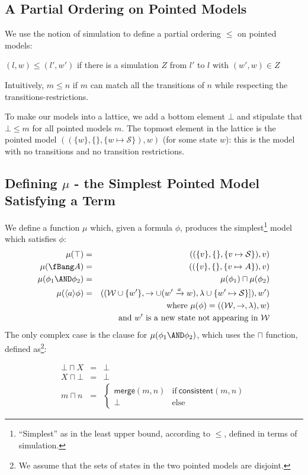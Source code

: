 \subsection{A Partial Ordering on Pointed Models}
We use the notion of simulation to define a partial ordering $\leq$ on pointed models:
\begin{definition}
$(l,w) \leq (l',w')$ if there is a simulation $Z$ from $l'$ to $l$ with $(w',w) \in Z$
\end{definition}
Intuitively, $m \leq n$ if $m$ can match all the transitions of $n$ while respecting the transitions-restrictions.

To make our models into a lattice, we add a bottom element $\bot$ and stipulate that $\bot \leq m$ for all pointed models $m$.
The topmost element in the lattice is the pointed model $( (\{w\}, \{\}, \{w \mapsto \mathcal{S}\}), w)$ (for some state $w$): this is the model with no transitions and no transition restrictions.

\subsection{Defining $\mu$ - the Simplest Pointed Model Satisfying a Term}
We define a function $\mu$ which, given a formula $\phi$, produces the simplest\footnote{``Simplest'' as in the least upper bound, according to $\leq$, defined in terms of simulation.} model which satisfies $\phi$:
\begin{eqnarray}
\mu (\top) & = & ( (\{v\}, \{\}, \{v \mapsto \mathcal{S}\}), v) \nonumber \\
\mu (\fBang A) & = & ( (\{v\}, \{\}, \{v \mapsto A\}), v) \nonumber \\
\mu (\phi_1 \AND \phi_2) & = & \mu(\phi_1) \sqcap \mu(\phi_2) \nonumber \\
\mu (\langle a \rangle \phi) & = & ( (\mathcal{W} \cup \{w'\}, \rightarrow \cup (w' \xrightarrow{a} w), \lambda \cup \{w' \mapsto \mathcal{S}\}]), w') \nonumber \\
		& & \mbox{where }\mu(\phi) = ( (\mathcal{W}, \rightarrow, \lambda), w) \nonumber \\
		& & \mbox{and }w' \mbox{ is a new state not appearing in }\mathcal{W} \nonumber
\end{eqnarray}
The only complex case is the clause for $\mu (\phi_1 \AND \phi_2)$, which uses the $\sqcap$ function, defined as\footnote{We assume that the sets of states in the two pointed models are disjoint.}:

\begin{eqnarray*}
  \bot \sqcap X 
     & = & 
  \bot \nonumber 
     \\
  X \sqcap \bot 
     & = & 
  \bot \nonumber 
     \\
  m \sqcap n 
     & = & 
  \begin{cases}
    \mathsf{merge}(m, n) & \text{if}\ \mathsf{consistent}(m, n) \\
    \bot & \text{else}
  \end{cases}
\end{eqnarray*}

